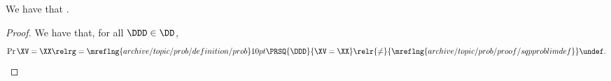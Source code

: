 \begin{proposition}
  We have that \pproblimdefprop.%
\end{proposition}

\begin{proof}
  We have that, for all $\DDD \in \DD$,
    $$ \Pr{\XV = \XX} \relrg = {\mreflng{archive/topic/prob/definition/prob}} 10pt
                    \PRSQ{\DDD}{\XV = \XX}
                    \relr {\ne} {\mreflng{archive/topic/prob/proof/sqpproblimdef}}
                    \undef.$$%
\end{proof}

